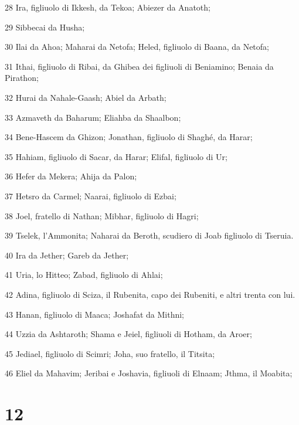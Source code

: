 \par 28 Ira, figliuolo di Ikkesh, da Tekoa; Abiezer da Anatoth;
\par 29 Sibbecai da Husha;
\par 30 Ilai da Ahoa; Maharai da Netofa; Heled, figliuolo di Baana, da Netofa;
\par 31 Ithai, figliuolo di Ribai, da Ghibea dei figliuoli di Beniamino; Benaia da Pirathon;
\par 32 Hurai da Nahale-Gaash; Abiel da Arbath;
\par 33 Azmaveth da Baharum; Eliahba da Shaalbon;
\par 34 Bene-Hascem da Ghizon; Jonathan, figliuolo di Shaghé, da Harar;
\par 35 Hahiam, figliuolo di Sacar, da Harar; Elifal, figliuolo di Ur;
\par 36 Hefer da Mekera; Ahija da Palon;
\par 37 Hetsro da Carmel; Naarai, figliuolo di Ezbai;
\par 38 Joel, fratello di Nathan; Mibhar, figliuolo di Hagri;
\par 39 Tselek, l'Ammonita; Naharai da Beroth, scudiero di Joab figliuolo di Tseruia.
\par 40 Ira da Jether; Gareb da Jether;
\par 41 Uria, lo Hitteo; Zabad, figliuolo di Ahlai;
\par 42 Adina, figliuolo di Sciza, il Rubenita, capo dei Rubeniti, e altri trenta con lui.
\par 43 Hanan, figliuolo di Maaca; Joshafat da Mithni;
\par 44 Uzzia da Ashtaroth; Shama e Jeiel, figliuoli di Hotham, da Aroer;
\par 45 Jediael, figliuolo di Scimri; Joha, suo fratello, il Titsita;
\par 46 Eliel da Mahavim; Jeribai e Joshavia, figliuoli di Elnaam; Jthma, il Moabita;

\chapter{12}

